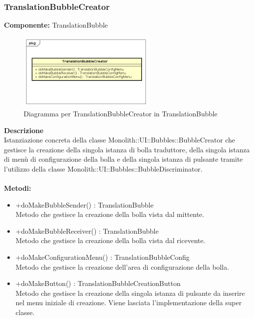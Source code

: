 \subsubsection{TranslationBubbleCreator}
\textbf{Componente:}  TranslationBubble\\
   \FloatBarrier
   \begin{figure}[ht]
   \centering
   \includegraphics[width=0.6\textwidth]{img/single-TranslationBubbleCreator}
   \caption{{Diagramma per TranslationBubbleCreator in TranslationBubble}}
\end{figure}
\FloatBarrier
\textbf{Descrizione}\\
Istanziazione concreta della classe Monolith::UI::Bubbles::BubbleCreator che gestisce la creazione della singola istanza di bolla traduttore, della singola istanza di menù di configurazione della bolla e della singola istanza di pulsante tramite l'utilizzo della classe Monolith::UI::Bubbles::BubbleDiscriminator.
\\
\\
\textbf{Metodi:} 
\begin{itemize}
\item +doMakeBubbleSender() : TranslationBubble 
\\
Metodo che gestisce la creazione della bolla vista dal mittente.
\item +doMakeBubbleReceiver() : TranslationBubble 
\\
Metodo che gestisce la creazione della bolla vista dal ricevente.
\item +doMakeConfigurationMenu() : TranslationBubbleConfig 
\\
Metodo che gestisce la creazione dell'area di configurazione della bolla.
\item +doMakeButton() : TranslationBubbleCreationButton 
\\
Metodo che gestisce la creazione della singola istanza di pulsante da inserire nel menu iniziale di creazione. Viene lasciata l'implementazione della super classe.
\end{itemize} 


